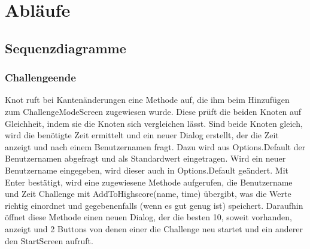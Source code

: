 \chapter{Abläufe}

\section{Sequenzdiagramme}
\subsection{Challengeende}
Knot ruft bei Kantenänderungen eine Methode auf, die ihm beim Hinzufügen zum ChallengeModeScreen zugewiesen wurde.
Diese prüft die beiden Knoten auf Gleichheit, indem sie die Knoten sich vergleichen lässt.
Sind beide Knoten gleich, wird die benötigte Zeit ermittelt und ein neuer Dialog erstellt, der die Zeit anzeigt und nach einem Benutzernamen fragt.
\newline
Dazu wird aus Options.Default der Benutzernamen abgefragt und als Standardwert eingetragen.
Wird ein neuer Benutzername eingegeben, wird dieser auch in Options.Default geändert.
Mit Enter bestätigt, wird eine zugewiesene Methode aufgerufen, die Benutzername und Zeit Challenge mit AddToHighscore(name, time) 
\newline
übergibt, was die Werte richtig einordnet und gegebenenfalls (wenn es gut genug ist) speichert.
Daraufhin öffnet diese Methode einen neuen Dialog, der die besten 10, soweit vorhanden, anzeigt und 2 Buttons 
von denen einer die Challenge neu startet und ein anderer den StartScreen aufruft.
\newline
\newline
